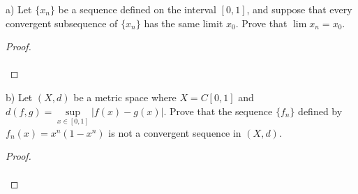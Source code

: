 a) Let $\{x_n\}$ be a sequence defined on the interval $[0, 1]$, and suppose that every \newline
   convergent subsequence of $\{x_n\}$ has the same limit $x_0$. Prove that $\lim{x_n} = x_0$.

\begin{proof}\renewcommand{\qedsymbol}{}\ \\\\
\end{proof}

\pagebreak

b) Let $(X, d)$ be a metric space where $X = C[0, 1]$ and $d(f, g) = \sup\limits_{x \in [0, 1]}{|f(x) - g(x)}|$. Prove
   that the sequence $\{f_n\}$ defined by $f_n(x) = x^n(1 - x^n)$ is not a convergent sequence in $(X, d)$.

\begin{proof}\renewcommand{\qedsymbol}{}\ \\\\
\end{proof}
